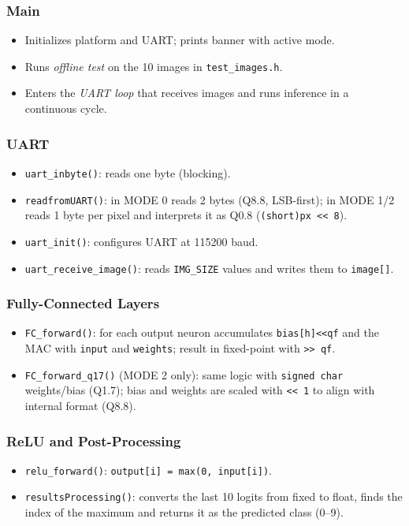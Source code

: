 \documentclass[11pt,a4paper]{article}
\begin{document}
\subsubsection{Main}
\begin{itemize}
    \item Initializes platform and UART; prints banner with active mode.
    \item Runs \emph{offline test} on the 10 images in \texttt{test\_images.h}.
    \item Enters the \emph{UART loop} that receives images and runs inference in a continuous cycle.
\end{itemize}

\subsubsection{UART}
\begin{itemize}
    \item \texttt{uart\_inbyte()}: reads one byte (blocking).
    \item \texttt{readfromUART()}: in MODE 0 reads 2 bytes (Q8.8, LSB-first); in MODE 1/2 reads 1 byte per pixel and interprets it as Q0.8 (\texttt{(short)px << 8}).
    \item \texttt{uart\_init()}: configures UART at 115200 baud.
    \item \texttt{uart\_receive\_image()}: reads \texttt{IMG\_SIZE} values and writes them to \texttt{image[]}.
\end{itemize}

\subsubsection{Fully-Connected Layers}
\begin{itemize}
    \item \texttt{FC\_forward()}: for each output neuron accumulates \texttt{bias[h]<<qf} and the MAC with \texttt{input} and \texttt{weights}; result in fixed-point with \texttt{>> qf}.
    \item \texttt{FC\_forward\_q17()} (MODE 2 only): same logic with \texttt{signed char} weights/bias (Q1.7); bias and weights are scaled with \texttt{<< 1} to align with internal format (Q8.8).
\end{itemize}

\subsubsection{ReLU and Post-Processing}
\begin{itemize}
    \item \texttt{relu\_forward()}: \texttt{output[i] = max(0, input[i])}.
    \item \texttt{resultsProcessing()}: converts the last 10 logits from fixed to float, finds the index of the maximum and returns it as the predicted class (0--9).
\end{itemize}
\end{document}
